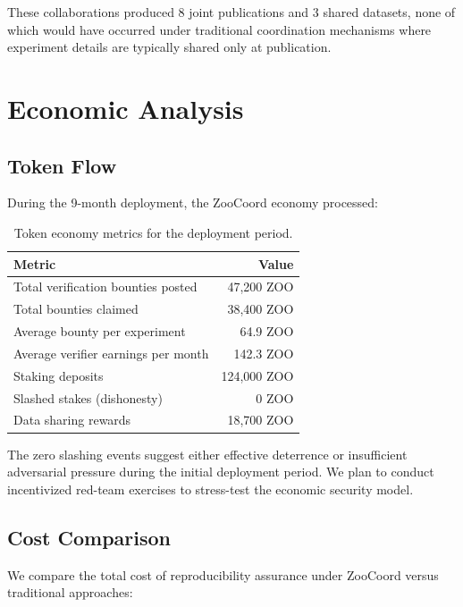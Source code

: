 \documentclass[11pt,a4paper]{article}
\begin{document}
These collaborations produced 8 joint publications and 3 shared datasets, none of which would have occurred under traditional coordination mechanisms where experiment details are typically shared only at publication.

\section{Economic Analysis}
\label{sec:economics}

\subsection{Token Flow}

During the 9-month deployment, the ZooCoord economy processed:

\begin{table}[H]
\centering
\caption{Token economy metrics for the deployment period.}
\label{tab:economics}
\begin{tabular}{@{}lr@{}}
\toprule
\textbf{Metric} & \textbf{Value} \\
\midrule
Total verification bounties posted & 47,200 ZOO \\
Total bounties claimed & 38,400 ZOO \\
Average bounty per experiment & 64.9 ZOO \\
Average verifier earnings per month & 142.3 ZOO \\
Staking deposits & 124,000 ZOO \\
Slashed stakes (dishonesty) & 0 ZOO \\
Data sharing rewards & 18,700 ZOO \\
\bottomrule
\end{tabular}
\end{table}

The zero slashing events suggest either effective deterrence or insufficient adversarial pressure during the initial deployment period.
We plan to conduct incentivized red-team exercises to stress-test the economic security model.

\subsection{Cost Comparison}

We compare the total cost of reproducibility assurance under ZooCoord versus traditional approaches:
\end{document}
